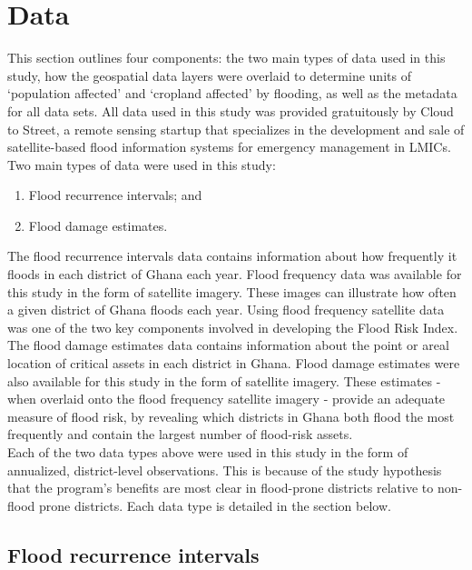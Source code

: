 \chapter{Data}

This section outlines four components: the two main types of data used in this study, how the geospatial data layers were overlaid to determine units of ‘population affected’ and ‘cropland affected’ by flooding, as well as the metadata for all data sets. All data used in this study was provided gratuitously by Cloud to Street, a remote sensing startup that specializes in the development and sale of satellite-based flood information systems for emergency management in LMICs.\\

Two main types of data were used in this study:

\begin{enumerate}
  \item Flood recurrence intervals; and
  \item Flood damage estimates.
\end{enumerate}

The flood recurrence intervals data contains information about how frequently it floods in each district of Ghana each year. Flood frequency data was available for this study in the form of satellite imagery. These images can illustrate how often a given district of Ghana floods each year. Using flood frequency satellite data was one of the two key components involved in developing the Flood Risk Index. The flood damage estimates data contains information about the point or areal location of critical assets in each district in Ghana. Flood damage estimates were also available for this study in the form of satellite imagery. These estimates - when overlaid onto the flood frequency satellite imagery - provide an adequate measure of flood risk, by revealing which districts in Ghana both flood the most frequently and contain the largest number of flood-risk assets.\\

Each of the two data types above were used in this study in the form of annualized, district-level observations. This is because of the study hypothesis that the program’s benefits are most clear in flood-prone districts relative to non-flood prone districts. Each data type is detailed in the section below.

\section{Flood recurrence intervals}

